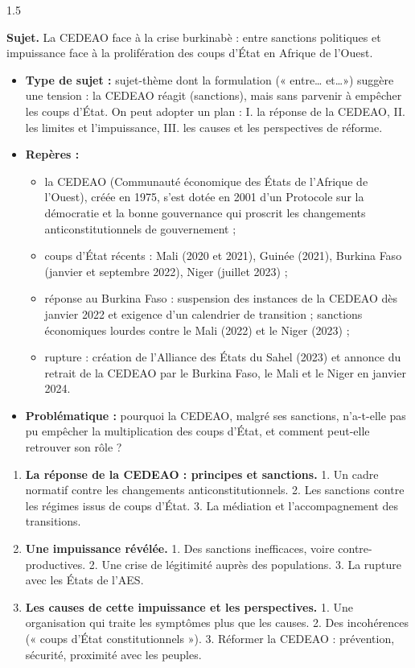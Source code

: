 \documentclass[12pt]{article}
\begin{document}
\begin{spacing}{1.5}

\noindent\textbf{Sujet.} La CEDEAO face à la crise burkinabè : entre sanctions politiques et impuissance face à la prolifération des coups d'État en Afrique de l'Ouest.


\begin{itemize}
\item \textbf{Type de sujet :} sujet-thème dont la formulation (« entre\dots{} et\dots ») suggère une tension : la CEDEAO réagit (sanctions), mais sans parvenir à empêcher les coups d'État. On peut adopter un plan : I. la réponse de la CEDEAO, II. les limites et l'impuissance, III. les causes et les perspectives de réforme.
\item \textbf{Repères :}
  \begin{itemize}
  \item la CEDEAO (Communauté économique des États de l'Afrique de l'Ouest), créée en 1975, s'est dotée en 2001 d'un Protocole sur la démocratie et la bonne gouvernance qui proscrit les changements anticonstitutionnels de gouvernement ;
  \item coups d'État récents : Mali (2020 et 2021), Guinée (2021), Burkina Faso (janvier et septembre 2022), Niger (juillet 2023) ;
  \item réponse au Burkina Faso : suspension des instances de la CEDEAO dès janvier 2022 et exigence d'un calendrier de transition ; sanctions économiques lourdes contre le Mali (2022) et le Niger (2023) ;
  \item rupture : création de l'Alliance des États du Sahel (2023) et annonce du retrait de la CEDEAO par le Burkina Faso, le Mali et le Niger en janvier 2024.
  \end{itemize}
\item \textbf{Problématique :} pourquoi la CEDEAO, malgré ses sanctions, n'a-t-elle pas pu empêcher la multiplication des coups d'État, et comment peut-elle retrouver son rôle ?
\end{itemize}


\begin{enumerate}
\item[I.] \textbf{La réponse de la CEDEAO : principes et sanctions.} 1. Un cadre normatif contre les changements anticonstitutionnels. 2. Les sanctions contre les régimes issus de coups d'État. 3. La médiation et l'accompagnement des transitions.
\item[II.] \textbf{Une impuissance révélée.} 1. Des sanctions inefficaces, voire contre-productives. 2. Une crise de légitimité auprès des populations. 3. La rupture avec les États de l'AES.
\item[III.] \textbf{Les causes de cette impuissance et les perspectives.} 1. Une organisation qui traite les symptômes plus que les causes. 2. Des incohérences (« coups d'État constitutionnels »). 3. Réformer la CEDEAO : prévention, sécurité, proximité avec les peuples.
\end{enumerate}


\end{spacing}
\end{document}
